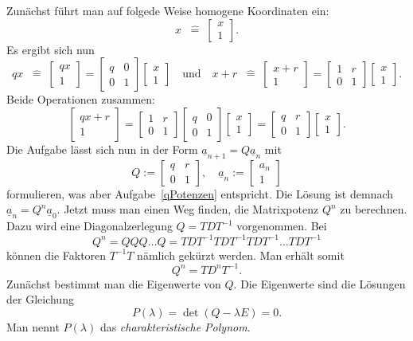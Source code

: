 \documentclass[a4paper,10pt,fleqn,twoside]{scrartcl}
\numberwithin{equation}{section}
\newcommand{\entspricht}{\;\;\hat =\;}
\theoremstyle{Aufgabe}
\begin{document}
Zunächst führt man auf folgede Weise homogene Koordinaten ein:
\[ x\entspricht\begin{bmatrix}x\\ 1\end{bmatrix}.\]
Es ergibt sich nun
\[ qx\entspricht\begin{bmatrix}qx\\ 1\end{bmatrix}
= \begin{bmatrix}
q & 0\\
0 & 1
\end{bmatrix}
\begin{bmatrix}x\\ 1\end{bmatrix}
\quad\text{und}\quad
x+r\entspricht\begin{bmatrix}x+r\\ 1\end{bmatrix}
= \begin{bmatrix}
1 & r\\
0 & 1
\end{bmatrix}
\begin{bmatrix}x\\ 1\end{bmatrix}.\]
Beide Operationen zusammen:
\[\begin{bmatrix}qx+r\\ 1\end{bmatrix}
= \begin{bmatrix}
1 & r\\
0 & 1
\end{bmatrix}
\begin{bmatrix}
q & 0\\
0 & 1
\end{bmatrix}
\begin{bmatrix}x\\ 1\end{bmatrix}
= \begin{bmatrix}
q & r\\
0 & 1
\end{bmatrix}
\begin{bmatrix}x\\ 1\end{bmatrix}.\]
Die Aufgabe lässt sich nun in der Form
$\underline a_{n+1} = Q\underline a_n$
mit
\[ Q:=\begin{bmatrix}
q & r\\
0 & 1
\end{bmatrix},\quad
\underline a_n := \begin{bmatrix}a_n\\ 1\end{bmatrix}\]
formulieren, was aber Aufgabe~\ref{qPotenzen} entspricht. Die
Lösung ist demnach
$\underline a_n = Q^n\underline a_0.$
Jetzt muss man einen Weg finden, die Matrixpotenz $Q^n$ zu berechnen.
Dazu wird eine Diagonalzerlegung $Q = TDT^{-1}$ vorgenommen.
Bei
\[Q^n = QQQ\ldots Q = TDT^{-1} TDT^{-1} TDT^{-1} \ldots TDT^{-1}\]
können die Faktoren $T^{-1}T$ nämlich gekürzt werden. Man erhält
somit
\[Q^n = TD^n T^{-1}.\]
Zunächst bestimmt man die Eigenwerte von $Q$. Die Eigenwerte
sind die Lösungen der Gleichung
\[P(\lambda) = \det(Q-\lambda E)=0.\]
Man nennt $P(\lambda)$ das \emph{charakteristische Polynom}.
\end{document}
